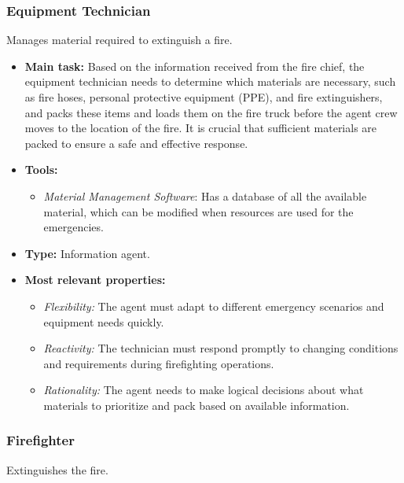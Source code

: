 \subsubsection{Equipment Technician}
Manages material required to extinguish a fire.

\begin{itemize}
    \item \textbf{Main task:}  Based on the information received from the fire chief, the equipment technician needs to determine which materials are necessary, such as fire hoses, personal protective equipment (PPE), and fire extinguishers, and packs these items and loads them on the fire truck before the agent crew moves to the location of the fire. It is crucial that sufficient materials are packed to ensure a safe and effective response.
    \item \textbf{Tools:}
    \begin{itemize}
        \item \textit{Material Management Software}: Has a database of all the available material, which can be modified when resources are used for the emergencies.
    \end{itemize}
    \item \textbf{Type:} Information agent.
    \item \textbf{Most relevant properties:}
    \begin{itemize}
        \item \textit{Flexibility:} The agent must adapt to different emergency scenarios and equipment needs quickly.
        \item \textit{Reactivity:} The technician must respond promptly to changing conditions and requirements during firefighting operations.
        \item \textit{Rationality:} The agent needs to make logical decisions about what materials to prioritize and pack based on available information.
    \end{itemize}
\end{itemize}

\subsubsection{Firefighter}
Extinguishes the fire.

